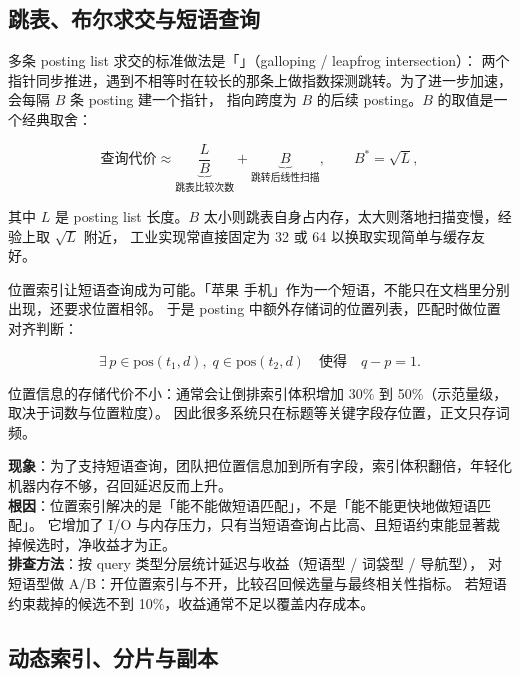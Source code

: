 \subsection{跳表、布尔求交与短语查询}

多条 posting list 求交的标准做法是「」（galloping / leapfrog intersection）：
两个指针同步推进，遇到不相等时在较长的那条上做指数探测跳转。为了进一步加速，会每隔 $B$ 条 posting 建一个指针，
指向跨度为 $B$ 的后续 posting。$B$ 的取值是一个经典取舍：

\begin{equation}
\text{查询代价} \approx \underbrace{\frac{L}{B}}_{\text{跳表比较次数}} + \underbrace{B}_{\text{跳转后线性扫描}} ,
\qquad B^{*} = \sqrt{L} ,
\label{eq:skipcost}
\end{equation}

其中 $L$ 是 posting list 长度。$B$ 太小则跳表自身占内存，太大则落地扫描变慢，经验上取 $\sqrt{L}$ 附近，
工业实现常直接固定为 32 或 64 以换取实现简单与缓存友好。

位置索引让短语查询成为可能。「苹果 手机」作为一个短语，不能只在文档里分别出现，还要求位置相邻。
于是 posting 中额外存储词的位置列表，匹配时做位置对齐判断：

\begin{equation}
\exists\, p \in \mathrm{pos}(t_1, d),\; q \in \mathrm{pos}(t_2, d) \quad \text{使得} \quad q - p = 1 .
\label{eq:phrase}
\end{equation}

位置信息的存储代价不小：通常会让倒排索引体积增加 30\% 到 50\%（示范量级，取决于词数与位置粒度）。
因此很多系统只在标题等关键字段存位置，正文只存词频。

\begin{pitfall}[「加了位置索引就一定更快」]
\textbf{现象}：为了支持短语查询，团队把位置信息加到所有字段，索引体积翻倍，年轻化机器内存不够，召回延迟反而上升。\\
\textbf{根因}：位置索引解决的是「能不能做短语匹配」，不是「能不能更快地做短语匹配」。
它增加了 I/O 与内存压力，只有当短语查询占比高、且短语约束能显著裁掉候选时，净收益才为正。\\
\textbf{排查方法}：按 query 类型分层统计延迟与收益（短语型 / 词袋型 / 导航型），
对短语型做 A/B：开位置索引与不开，比较召回候选量与最终相关性指标。
若短语约束裁掉的候选不到 10\%，收益通常不足以覆盖内存成本。
\end{pitfall}

\subsection{动态索引、分片与副本}
\label{sec:search-dynamic}

